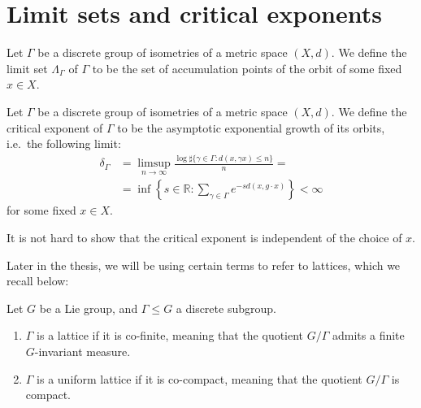 \documentclass{report}
\begin{document}
\section{Limit sets and critical exponents}
\begin{definition}\label{def:limit_set}
    Let $\Gamma$ be a discrete group of isometries of a metric space $(X,d)$.
    We define the limit set $\Lambda_\Gamma$ of $\Gamma$ to be the set of accumulation points of the orbit of some fixed $x \in X$.
\end{definition}
\begin{definition}\label{def:group_critical_exponent}
    Let $\Gamma$ be a discrete group of isometries of a metric space $(X,d)$.
    We define the critical exponent of $\Gamma$ to be the asymptotic exponential growth of its orbits, i.e.\ the following limit:
    \begin{align*}
        \delta_\Gamma &= \limsup_{n\to \infty} \frac{\log \sharp \{ \gamma \in \Gamma : d(x, \gamma x) \leq n \}}{n} =\\
        &= \inf \left\{ 
            s \in \mathbb R : \sum_{\gamma \in \Gamma} e^{-s d(x, g \cdot x)}
        \right\}  < \infty
    \end{align*}
    for some fixed $x \in X$.
\end{definition}
\begin{remark}
    It is not hard to show that the critical exponent is independent of the choice of $x$.    
\end{remark}


Later in the thesis, we will be using certain terms to refer to lattices, which we recall below:
\begin{definition}
    Let $G$ be a Lie group, and $\Gamma \leq G$ a discrete subgroup. 
    \begin{enumerate}[label=(\roman*)]
        \item $\Gamma$ is a lattice if it is co-finite, meaning that the quotient $G/\Gamma$ admits a finite $G$-invariant measure.
        \item $\Gamma$ is a uniform lattice if it is co-compact, meaning that the quotient $G/\Gamma$ is compact.
    \end{enumerate}
\end{definition}
\end{document}
